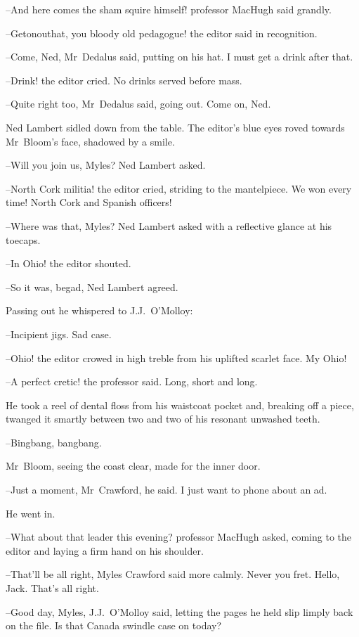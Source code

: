 --And here comes the sham squire himself!
professor MacHugh said grandly.

--Getonouthat, you bloody old pedagogue!
the editor said in recognition.

--Come, Ned,
Mr~Dedalus said, putting on his hat.
I must get a drink after that.

--Drink!
the editor cried.
No drinks served before mass.

--Quite right too,
Mr~Dedalus said, going out.
Come on, Ned.

Ned Lambert sidled down from the table.
The editor's blue eyes roved towards Mr~Bloom's face,
shadowed by a smile.

--Will you join us, Myles?
Ned Lambert asked.



--North Cork militia!
the editor cried,
striding to the mantelpiece.
We won every time!
North Cork and Spanish officers!

--Where was that, Myles?
Ned Lambert asked with a reflective glance at his toecaps.

--In Ohio!
the editor shouted.

--So it was, begad,
Ned Lambert agreed.

Passing out he whispered to J.J.~O'Molloy:

--Incipient jigs.
Sad case.

--Ohio!
the editor crowed in high treble from his uplifted scarlet face.
My Ohio!

--A perfect cretic!
the professor said.
Long, short and long.



He took a reel of dental floss from his waistcoat pocket
and, breaking off a piece,
twanged it smartly between two and two of his resonant unwashed teeth.

--Bingbang, bangbang.

Mr~Bloom, seeing the coast clear,
made for the inner door.

--Just a moment, Mr~Crawford,
he said.
I just want to phone about an ad.

He went in.

--What about that leader this evening?
professor MacHugh asked,
coming to the editor and laying a firm hand on his shoulder.

--That'll be all right,
Myles Crawford said more calmly.
Never you fret.
Hello, Jack.
That's all right.

--Good day, Myles,
J.J.~O'Molloy said,
letting the pages he held slip limply back on the file.
Is that Canada swindle case on today?

